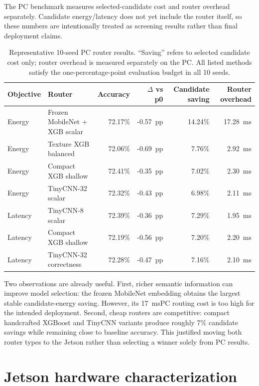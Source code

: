 \documentclass[11pt,a4paper]{article}
\newcommand{\pp}{~pp}
\newcommand{\ms}{~ms}
\begin{document}
The PC benchmark measures selected-candidate cost and router overhead separately. Candidate energy/latency does not yet include the router itself, so these numbers are intentionally treated as screening results rather than final deployment claims.

\begin{table}[H]
\centering
\small
\caption{Representative 10-seed PC router results. ``Saving'' refers to selected candidate cost only; router overhead is measured separately on the PC. All listed methods satisfy the one-percentage-point evaluation budget in all 10 seeds.}
\begin{tabularx}{\textwidth}{@{}lXrrrr@{}}
\toprule
Objective & Router & Accuracy & $\Delta$ vs p0 & Candidate saving & Router overhead \\
\midrule
Energy & Frozen MobileNet + XGB scalar & 72.17\% & -0.57\pp & 14.24\% & 17.28\ms \\
Energy & Texture XGB balanced & 72.06\% & -0.69\pp & 7.76\% & 2.92\ms \\
Energy & Compact XGB shallow & 72.41\% & -0.35\pp & 7.02\% & 2.30\ms \\
Energy & TinyCNN-32 scalar & 72.32\% & -0.43\pp & 6.98\% & 2.11\ms \\
\addlinespace
Latency & TinyCNN-8 scalar & 72.39\% & -0.36\pp & 7.29\% & 1.95\ms \\
Latency & Compact XGB shallow & 72.19\% & -0.56\pp & 7.20\% & 2.20\ms \\
Latency & TinyCNN-32 correctness & 72.28\% & -0.47\pp & 7.16\% & 2.10\ms \\
\bottomrule
\end{tabularx}
\label{tab:pc-router}
\end{table}

Two observations are already useful. First, richer semantic information can improve model selection: the frozen MobileNet embedding obtains the largest stable candidate-energy saving. However, its 17\ms PC routing cost is too high for the intended deployment. Second, cheap routers are competitive: compact handcrafted XGBoost and TinyCNN variants produce roughly 7\% candidate savings while remaining close to baseline accuracy. This justified moving both router types to the Jetson rather than selecting a winner solely from PC results.

\section{Jetson hardware characterization}
\end{document}
